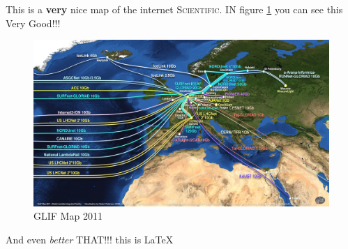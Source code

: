 This is a \textbf{very} nice map of the internet \textsc{Scientific}. IN figure \ref{fig:glif} you can see this {\LARGE Very Good!!!}

\begin{figure}[H]
	\centering
	\includegraphics[width=1.0\linewidth,trim=0.0cm .0cm .0cm .0cm,clip]{pictures/GLIF_5-11_Eur_2k-enhanced.jpg}
	\caption{GLIF Map 2011}
	\label{fig:glif}
\end{figure}

And even \textit{better} {\Huge THAT!!!} this is  \LaTeX